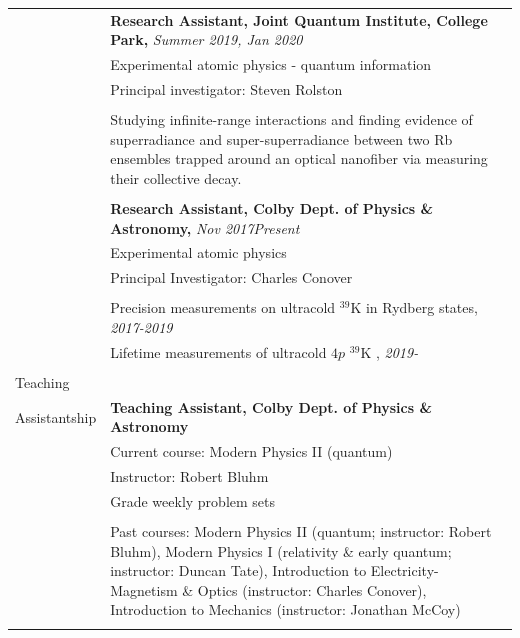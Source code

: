 \documentclass[10pt]{article}
\begin{document}
\begin{longtable}{ l m{13.5cm}   }
  						
  						& \textbf{Research Assistant, Joint Quantum Institute, College Park,} \textit{Summer 2019, Jan 2020}  \\
  						& Experimental atomic physics - quantum information \\
     					& Principal investigator:  Steven Rolston\\  \vspace{-9pt}
     					& \\
     					& Studying infinite-range interactions and finding evidence of superradiance and super-superradiance between two Rb ensembles trapped around an optical nanofiber via measuring their collective decay. \\
     					& \\
     					
     					 
     					& \textbf{Research Assistant, Colby Dept. of Physics \& Astronomy,} \textit{Nov 2017\textendash Present }\\
     					& Experimental atomic physics \\
     					& Principal Investigator: Charles Conover \\ \vspace{-9pt}
     					& \\
     					& Precision measurements on ultracold $^{\text{39}}$K in Rydberg states, \textit{2017-2019} \\
     					& Lifetime measurements of ultracold $4p$ $^{\text{39}}$K , \textit{2019-}\\
     					& \\
     					
     					

     					   					 
     					 
     					 
  \large{Teaching}   	& \\ 
  \large{Assistantship} & \textbf{Teaching Assistant, Colby Dept. of Physics \& Astronomy} \\
  						& Current course: Modern Physics II (quantum)\\
    					& Instructor: Robert Bluhm \\
    					& Grade weekly problem sets \\ \vspace{-9pt}
     					& \\ 
     					& Past courses: Modern Physics II (quantum; instructor: Robert Bluhm), Modern Physics I (relativity \& early quantum; instructor: Duncan Tate), Introduction to Electricity-Magnetism \& Optics (instructor: Charles Conover), Introduction to Mechanics (instructor: Jonathan McCoy)\\
     					& \\
     					 

\end{longtable}
\end{document}
